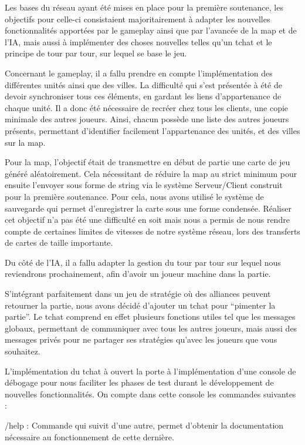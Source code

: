 \documentclass[12pt]{report}
\begin{document}
Les bases du réseau ayant été mises en place pour la première soutenance, les
objectifs pour celle-ci consistaient majoritairement à adapter les nouvelles
fonctionnalités apportées par le gameplay ainsi que par l’avancée de la map et
de l’IA, mais aussi à implémenter des choses nouvelles telles qu’un tchat et le
principe de tour par tour, sur lequel se base le jeu.

Concernant le gameplay, il a fallu prendre en compte l’implémentation des
différentes unités ainsi que des villes. La difficulté qui s’est présentée à
été de devoir synchroniser tous ces éléments, en gardant les liens
d'appartenance de chaque unité. Il a donc été nécessaire de recréer chez tous
les clients, une copie minimale des autres joueurs. Ainsi, chacun possède une
liste des autres joueurs présents, permettant d'identifier facilement
l'appartenance des unités, et des villes sur la map.

Pour la map, l’objectif était de transmettre en début de partie une carte de
jeu généré aléatoirement. Cela nécessitant de réduire la map au strict minimum
pour ensuite l’envoyer sous forme de string via le système Serveur/Client
construit pour la première soutenance. Pour cela, nous avons utilisé le système
de sauvegarde qui permet d’enregistrer la carte sous une forme condensée.
Réaliser cet objectif n’a pas été une difficulté en soit mais nous a permis de
nous rendre compte de certaines limites de vitesses de notre système réseau,
lors des transferts de cartes de taille importante.

Du côté de l’IA, il a fallu adapter la gestion du tour par tour sur lequel nous
reviendrons prochainement, afin d'avoir un joueur machine dans la partie.

S'intégrant parfaitement dans un jeu de stratégie où des alliances peuvent
retourner la partie, nous avons décidé d’ajouter un tchat pour “pimenter la
partie”. Le tchat comprend en effet plusieurs fonctions utiles tel que les
messages globaux, permettant de communiquer avec tous les autres joueurs, mais
aussi des messages privés pour ne partager ses stratégies qu’avec les joueurs
que vous souhaitez.

L’implémentation du tchat à ouvert la porte à l’implémentation d’une console de
débogage pour nous faciliter les phases de test durant le développement de
nouvelles fonctionnalités. On compte dans cette console les commandes
suivantes : 

/help : Commande qui suivit d’une autre, permet d’obtenir la documentation
nécessaire au fonctionnement de cette dernière.
\end{document}
